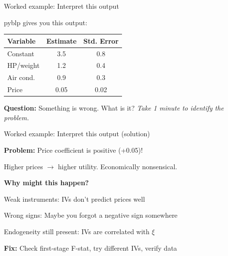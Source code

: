 \documentclass[notes,11pt, aspectratio=169]{beamer}
\newenvironment{wideitemize}{\itemize\addtolength{\itemsep}{10pt}}{\enditemize}
\newenvironment{wideenumerate}{\enumerate\addtolength{\itemsep}{10pt}}{\endenumerate}
\begin{document}
\begin{frame}{Worked example: Interpret this output}
	\begin{wideitemize}
		\item pyblp gives you this output:
		\begin{center}
		\begin{tabular}{lcc}
			\toprule
			\textbf{Variable} & \textbf{Estimate} & \textbf{Std. Error} \\
			\midrule
			Constant & 3.5 & 0.8 \\
			HP/weight & 1.2 & 0.4 \\
			Air cond. & 0.9 & 0.3 \\
			Price & 0.05 & 0.02 \\
			\bottomrule
		\end{tabular}
		\end{center}
		\item \textbf{Question:} Something is wrong. What is it?
	\end{wideitemize}
	\vspace{15pt}
	\centering
	\textit{Take 1 minute to identify the problem.}
\end{frame}

\begin{frame}{Worked example: Interpret this output (solution)}
	\begin{wideitemize}
		\item \textbf{Problem:} Price coefficient is positive (+0.05)!
		\begin{wideitemize}
			\item Higher prices $\rightarrow$ higher utility. Economically nonsensical.
		\end{wideitemize}
		\item \textbf{Why might this happen?}
		\begin{wideenumerate}
			\item Weak instruments: IVs don't predict prices well
			\item Wrong signs: Maybe you forgot a negative sign somewhere
			\item Endogeneity still present: IVs are correlated with $\xi$
		\end{wideenumerate}
		\item \textbf{Fix:} Check first-stage F-stat, try different IVs, verify data
	\end{wideitemize}
\end{frame}
\end{document}
